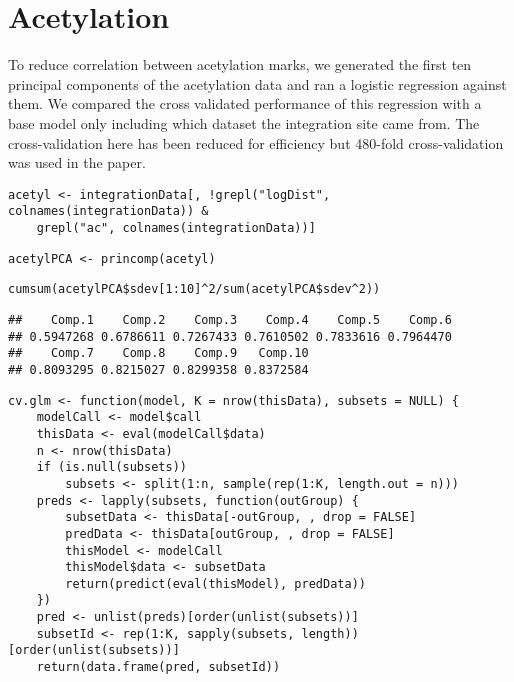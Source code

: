 \documentclass[../../sherrill-Mix_thesis.tex]{subfiles}
\makeatletter
\newenvironment{kframe}{%
 \def\at@end@of@kframe{}%
 \ifinner\ifhmode%
  \def\at@end@of@kframe{\end{minipage}}%
  \begin{minipage}{\columnwidth}%
 \fi\fi%
 \def\FrameCommand##1{\hskip\@totalleftmargin \hskip-\fboxsep
 \colorbox{shadecolor}{##1}\hskip-\fboxsep
     \hskip-\linewidth \hskip-\@totalleftmargin \hskip\columnwidth}%
 \MakeFramed {\advance\hsize-\width
   \@totalleftmargin\z@ \linewidth\hsize
   \@setminipage}}%
 {\par\unskip\endMakeFramed%
 \at@end@of@kframe}
\newenvironment{knitrout}{}{} %
\makeatother
\begin{document}
\section{Acetylation}
To reduce correlation between acetylation marks, we generated the first ten principal components of the acetylation data and ran a logistic regression against them. We compared the cross validated performance of this regression with a base model only including which dataset the integration site came from. The cross-validation here has been reduced for efficiency but 480-fold cross-validation was used in the paper.
\begin{knitrout}
\color{fgcolor}\begin{kframe}
\begin{lstlisting}[basicstyle=\ttfamily,breaklines=true]
acetyl <- integrationData[, !grepl("logDist", colnames(integrationData)) & 
    grepl("ac", colnames(integrationData))]\end{lstlisting}
\begin{lstlisting}[basicstyle=\ttfamily,breaklines=true]
acetylPCA <- princomp(acetyl)\end{lstlisting}
\begin{lstlisting}[basicstyle=\ttfamily,breaklines=true]
cumsum(acetylPCA$sdev[1:10]^2/sum(acetylPCA$sdev^2))\end{lstlisting}
\begin{lstlisting}[basicstyle=\ttfamily,breaklines=true]
##    Comp.1    Comp.2    Comp.3    Comp.4    Comp.5    Comp.6 
## 0.5947268 0.6786611 0.7267433 0.7610502 0.7833616 0.7964470 
##    Comp.7    Comp.8    Comp.9   Comp.10 
## 0.8093295 0.8215027 0.8299358 0.8372584
\end{lstlisting}
\begin{lstlisting}[basicstyle=\ttfamily,breaklines=true]
cv.glm <- function(model, K = nrow(thisData), subsets = NULL) {
    modelCall <- model$call
    thisData <- eval(modelCall$data)
    n <- nrow(thisData)
    if (is.null(subsets)) 
        subsets <- split(1:n, sample(rep(1:K, length.out = n)))
    preds <- lapply(subsets, function(outGroup) {
        subsetData <- thisData[-outGroup, , drop = FALSE]
        predData <- thisData[outGroup, , drop = FALSE]
        thisModel <- modelCall
        thisModel$data <- subsetData
        return(predict(eval(thisModel), predData))
    })
    pred <- unlist(preds)[order(unlist(subsets))]
    subsetId <- rep(1:K, sapply(subsets, length))[order(unlist(subsets))]
    return(data.frame(pred, subsetId))

\end{lstlisting}
\end{kframe}
\end{knitrout}
\end{document}
